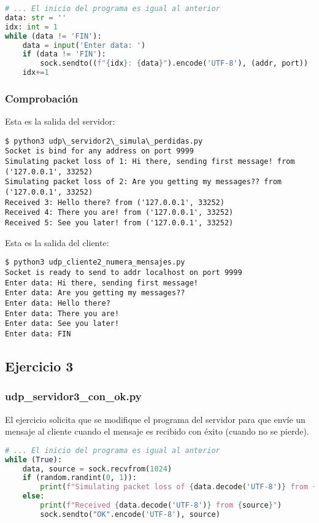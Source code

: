 \begin{lstlisting}[language=Python]
# ... El inicio del programa es igual al anterior
data: str = ''
idx: int = 1
while (data != 'FIN'):
    data = input('Enter data: ')
    if (data != 'FIN'):
        sock.sendto((f"{idx}: {data}").encode('UTF-8'), (addr, port))
    idx+=1
\end{lstlisting}

\subsubsection{Comprobación}

Esta es la salida del servidor:

\begin{lstlisting}
$ python3 udp\_servidor2\_simula\_perdidas.py
Socket is bind for any address on port 9999
Simulating packet loss of 1: Hi there, sending first message! from ('127.0.0.1', 33252)
Simulating packet loss of 2: Are you getting my messages?? from ('127.0.0.1', 33252)
Received 3: Hello there? from ('127.0.0.1', 33252)
Received 4: There you are! from ('127.0.0.1', 33252)
Received 5: See you later! from ('127.0.0.1', 33252)
\end{lstlisting}

Esta es la salida del cliente:

\begin{lstlisting}
$ python3 udp_cliente2_numera_mensajes.py
Socket is ready to send to addr localhost on port 9999
Enter data: Hi there, sending first message!
Enter data: Are you getting my messages??
Enter data: Hello there?
Enter data: There you are!
Enter data: See you later!
Enter data: FIN
\end{lstlisting}

\subsection{Ejercicio 3}

\subsubsection{udp\_servidor3\_con\_ok.py}

El ejercicio solicita que se modifique el programa del servidor para que envíe un mensaje al cliente
cuando el mensaje es recibido con éxito (cuando no se pierde).

\begin{lstlisting}[language=Python]
# ... El inicio del programa es igual al anterior
while (True):
    data, source = sock.recvfrom(1024)
    if (random.randint(0, 1)):
        print(f"Simulating packet loss of {data.decode('UTF-8')} from {source}")
    else:
        print(f"Received {data.decode('UTF-8')} from {source}")
        sock.sendto("OK".encode('UTF-8'), source)
\end{lstlisting}

